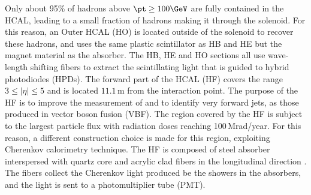 Only about 95\% of hadrons above $\pt\geq100\GeV$ are fully contained in the HCAL, leading to a small fraction of hadrons making it through the solenoid. 
For this reason, an Outer HCAL (HO) is located outside of the solenoid to recover these hadrons, and uses the same plastic scintillator as HB and HE but the magnet material as the absorber. 
The HB, HE and HO sections all use wave-length shifting fibers to extract the scintillating light that is guided to hybrid photodiodes (HPDs).  
The forward part of the HCAL (HF) covers the range $3\leq|\eta|\leq5$ and is located $11.1\,$m from the interaction point. 
The purpose of the HF is to improve the measurement of \ptmiss and to identify very forward jets, as those produced in vector boson fusion (VBF). 
The region covered by the HF is subject to the largest particle flux with radiation doses reaching 100$\,$Mrad/year. 
For this reason, a different construction choice is made for this region, exploiting Cherenkov calorimetry technique. 
The HF is composed of steel absorber interspersed with quartz core and acrylic clad fibers in the longitudinal direction \cite{CERN-LHCC-97-031}.
The fibers collect the Cherenkov light produced be the showers in the absorbers, and the light is sent to a photomultiplier tube (PMT).    
